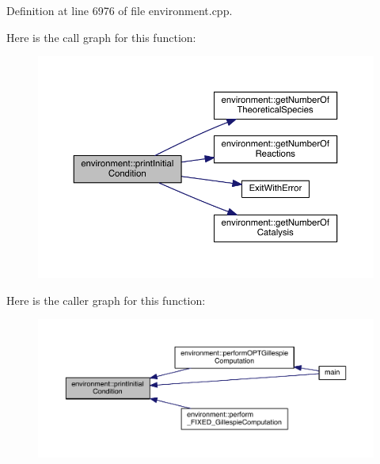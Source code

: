 Definition at line 6976 of file environment.\-cpp.



Here is the call graph for this function\-:\nopagebreak
\begin{figure}[H]
\begin{center}
\leavevmode
\includegraphics[width=350pt]{a00014_a429c2529badaeda72e553f500b990e11_cgraph}
\end{center}
\end{figure}




Here is the caller graph for this function\-:\nopagebreak
\begin{figure}[H]
\begin{center}
\leavevmode
\includegraphics[width=350pt]{a00014_a429c2529badaeda72e553f500b990e11_icgraph}
\end{center}
\end{figure}


